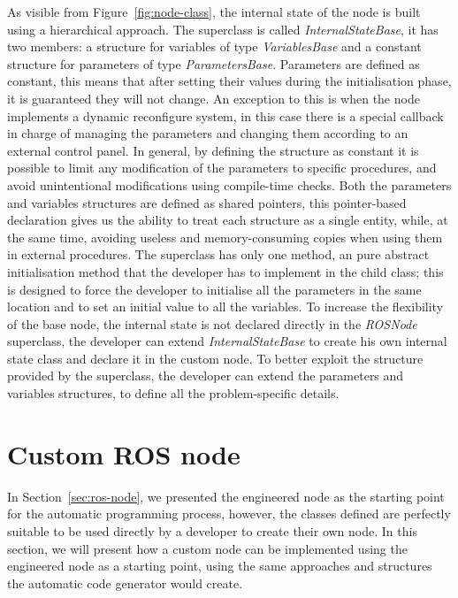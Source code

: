 As visible from Figure~\ref{fig:node-class}, the internal state of the node is built using a hierarchical approach. The superclass is called \textit{InternalStateBase}, it has two members: a structure for variables of type \textit{VariablesBase} and a constant structure for parameters of type  \textit{ParametersBase}. Parameters are defined as constant, this means that after setting their values during the initialisation phase, it is guaranteed they will not change. An exception to this is when the node implements a dynamic reconfigure system, in this case there is a special callback in charge of managing the parameters and changing them according to an external control panel. In general, by defining the structure as constant it is possible to limit any modification of the parameters to specific procedures, and avoid unintentional modifications using compile-time checks. Both the parameters and variables structures are defined as shared pointers, this pointer-based declaration gives us the ability to treat each structure as a single entity, while, at the same time, avoiding useless and memory-consuming copies when using them in external procedures. The superclass has only one method, an pure abstract initialisation method that the developer has to implement in the child class; this is designed to force the developer to initialise all the parameters in the same location and to set an initial value to all the variables. To increase the flexibility of the base node, the internal state is not declared directly in the \textit{ROSNode} superclass, the developer can extend \textit{InternalStateBase} to create his own internal state class and declare it in the custom node. To better exploit the structure provided by the superclass, the developer can extend the parameters and variables structures, to define all the problem-specific details.

\section{Custom ROS node}
In Section~\ref{sec:ros-node}, we presented the engineered node as the starting point for the automatic programming process, however, the classes defined are perfectly suitable to be used directly by a developer to create their own node. In this section, we will present how a custom node can be implemented using the engineered node as a starting point, using the same approaches and structures the automatic code generator would create.

